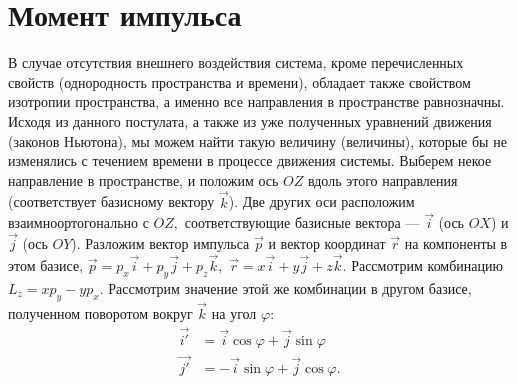 \section{Момент импульса}
В случае отсутствия внешнего воздействия система,
кроме перечисленных свойств (однородность пространства и времени),
обладает также свойством изотропии пространства, а именно
все направления в пространстве равнозначны. Исходя из
данного постулата, а также
из уже полученных уравнений движения (законов Ньютона),
мы можем найти такую величину (величины),
которые бы не изменялись с течением времени в процессе движения системы.
Выберем некое направление в пространстве, и положим ось $OZ$ вдоль этого
направления (соответствует базисному вектору $\vec{k}$). Две других
оси расположим взаимноортогонально с $OZ,$ соответствующие
базисные вектора --- $\vec{i}$ (ось $OX$) и $\vec{j}$ (ось $OY$).
Разложим вектор импульса $\vec{p}$ и вектор координат $\vec{r}$ на компоненты
в этом базисе, 
$\vec{p} = p_x \vec{i} + p_y \vec{j} + p_z \vec{k},$
$\vec{r} = x \vec{i} + y \vec{j} + z \vec{k}.$
Рассмотрим комбинацию $L_z = x p_y - y p_x.$
Рассмотрим значение этой же комбинации в другом базисе, полученном
поворотом вокруг $\vec{k}$ на угол $\varphi$:
\begin{align*}
\vec{i'} &= \vec{i} \cos \varphi + \vec{j} \sin \varphi\\
\vec{j'} &= - \vec{i} \sin \varphi + \vec{j} \cos \varphi.
\end{align*}
